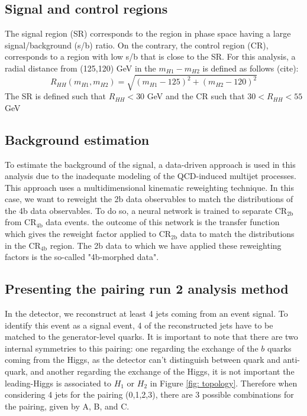 \subsection{Signal and control regions}

The signal region (SR) corresponds to the region in phase space having a large signal/background (s/b) ratio. On the contrary, the control region (CR), corresponds to a region with low s/b that is close to the SR. For this analysis, a radial distance from (125,120) GeV in the $m_{H1}-m_{H2}$ is defined as follows (cite):
\begin{equation}
    R_{HH}(m_{H1}, m_{H2})=\sqrt{(m_{H1}-125)^2+(m_{H2}-120)^2}
\end{equation}
The SR is defined such that $R_{HH} < 30$ GeV and the CR such that $30 < R_{HH} < 55$ GeV


\subsection{Background estimation} \label{subsection: bckg estimation}

To estimate the background of the signal, a data-driven approach is used in this analysis due to the inadequate modeling of the QCD-induced multijet processes. This approach uses a multidimensional kinematic reweighting technique. In this case, we want to reweight the 2b data observables to match the distributions of the 4b data observables. To do so, a neural network is trained to separate CR$_{\text{2b}}$ from CR$_{\text{4b}}$ data events. the outcome of this network is the transfer function which gives the reweight factor applied to CR$_{\text{2b}}$ data to match the distributions in the  CR$_{\text{4b}}$ region. The 2b data to which we have applied these reweighting factors is the so-called "4b-morphed data".


\subsection{Presenting the pairing run 2 analysis method}

In the detector, we reconstruct at least 4 jets coming from an event signal. To identify this event as a signal event, 4 of the reconstructed jets have to be matched to the generator-level quarks. It is important to note that there are two internal symmetries to this pairing: one regarding the exchange of the $b$ quarks coming from the Higgs, as the detector can't distinguish between quark and anti-quark, and another regarding the exchange of the Higgs, it is not important the leading-\pt Higgs is associated to $H_1$ or $H_2$ in Figure \ref{fig: topology}. Therefore when considering 4 jets for the pairing (0,1,2,3), there are 3 possible combinations for the pairing, given by A, B, and C.

